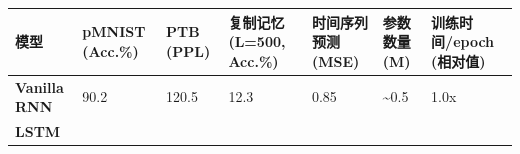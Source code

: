 \documentclass[
  12pt,
]{article}
\begin{document}
\begin{longtable}[]{@{}lllllll@{}}
\toprule
\begin{minipage}[b]{0.12\columnwidth}\raggedright
模型\strut
\end{minipage} & \begin{minipage}[b]{0.12\columnwidth}\raggedright
pMNIST (Acc.\%)\strut
\end{minipage} & \begin{minipage}[b]{0.12\columnwidth}\raggedright
PTB (PPL)\strut
\end{minipage} & \begin{minipage}[b]{0.12\columnwidth}\raggedright
复制记忆 (L=500, Acc.\%)\strut
\end{minipage} & \begin{minipage}[b]{0.12\columnwidth}\raggedright
时间序列预测 (MSE)\strut
\end{minipage} & \begin{minipage}[b]{0.12\columnwidth}\raggedright
参数数量 (M)\strut
\end{minipage} & \begin{minipage}[b]{0.12\columnwidth}\raggedright
训练时间/epoch (相对值)\strut
\end{minipage}\tabularnewline
\midrule
\endhead
\begin{minipage}[t]{0.12\columnwidth}\raggedright
\textbf{Vanilla RNN}\strut
\end{minipage} & \begin{minipage}[t]{0.12\columnwidth}\raggedright
90.2\strut
\end{minipage} & \begin{minipage}[t]{0.12\columnwidth}\raggedright
120.5\strut
\end{minipage} & \begin{minipage}[t]{0.12\columnwidth}\raggedright
12.3\strut
\end{minipage} & \begin{minipage}[t]{0.12\columnwidth}\raggedright
0.85\strut
\end{minipage} & \begin{minipage}[t]{0.12\columnwidth}\raggedright
\textasciitilde0.5\strut
\end{minipage} & \begin{minipage}[t]{0.12\columnwidth}\raggedright
1.0x\strut
\end{minipage}\tabularnewline
\begin{minipage}[t]{0.12\columnwidth}\raggedright
\textbf{LSTM}\strut
\end{minipage} & \begin{minipage}[t]{0.12\columnwidth}\raggedright

\end{minipage}
\end{longtable}
\end{document}
